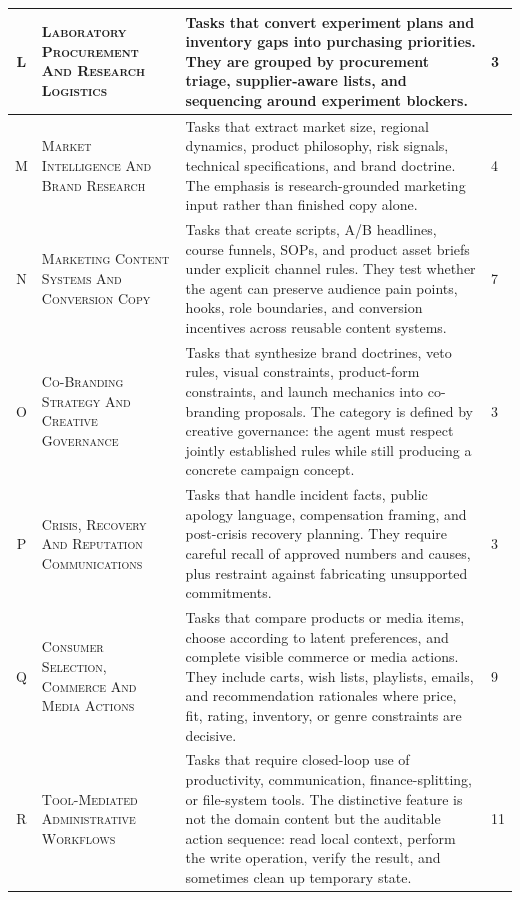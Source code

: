 {\begin{longtable}{cp{}p{}p{}}
L &
\textsc{Laboratory Procurement And Research Logistics} &
Tasks that convert experiment plans and inventory gaps into purchasing priorities. They are grouped by procurement triage, supplier-aware lists, and sequencing around experiment blockers. &
3 \\
\midrule[0.75pt]

M &
\textsc{Market Intelligence And Brand Research} &
Tasks that extract market size, regional dynamics, product philosophy, risk signals, technical specifications, and brand doctrine. The emphasis is research-grounded marketing input rather than finished copy alone. &
4 \\
\midrule[0.75pt]

N &
\textsc{Marketing Content Systems And Conversion Copy} &
Tasks that create scripts, A/B headlines, course funnels, SOPs, and product asset briefs under explicit channel rules. They test whether the agent can preserve audience pain points, hooks, role boundaries, and conversion incentives across reusable content systems. &
7 \\
\midrule[0.75pt]

O &
\textsc{Co-Branding Strategy And Creative Governance} &
Tasks that synthesize brand doctrines, veto rules, visual constraints, product-form constraints, and launch mechanics into co-branding proposals. The category is defined by creative governance: the agent must respect jointly established rules while still producing a concrete campaign concept. &
3 \\
\midrule[0.75pt]

P &
\textsc{Crisis, Recovery And Reputation Communications} &
Tasks that handle incident facts, public apology language, compensation framing, and post-crisis recovery planning. They require careful recall of approved numbers and causes, plus restraint against fabricating unsupported commitments. &
3 \\
\midrule[0.75pt]

Q &
\textsc{Consumer Selection, Commerce And Media Actions} &
Tasks that compare products or media items, choose according to latent preferences, and complete visible commerce or media actions. They include carts, wish lists, playlists, emails, and recommendation rationales where price, fit, rating, inventory, or genre constraints are decisive. &
9 \\
\midrule[0.75pt]

R &
\textsc{Tool-Mediated Administrative Workflows} &
Tasks that require closed-loop use of productivity, communication, finance-splitting, or file-system tools. The distinctive feature is not the domain content but the auditable action sequence: read local context, perform the write operation, verify the result, and sometimes clean up temporary state. &
11 \\
\end{longtable}
}
